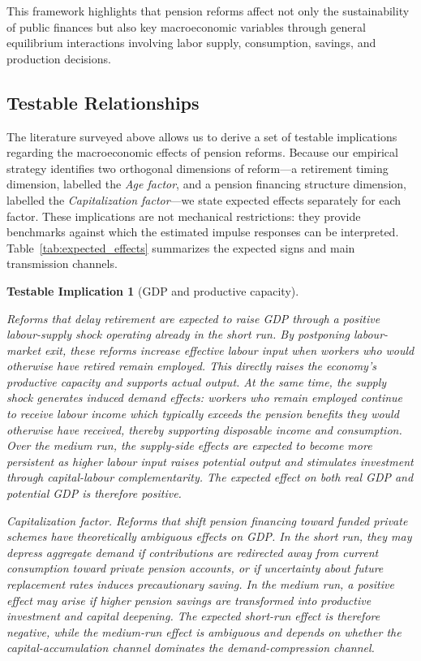\documentclass[11pt,english,a4paper, twoside, authoryear]{article}
\newtheorem{testable}{Testable Implication}}
\begin{document}
This framework highlights that pension reforms affect not only the sustainability of public finances but also key macroeconomic variables through general equilibrium interactions involving labor supply, consumption, savings, and production decisions.

\subsection{Testable Relationships}\label{sec:TR}

The literature surveyed above allows us to derive a set of testable implications regarding the macroeconomic effects of pension reforms. Because our empirical strategy identifies two orthogonal dimensions of reform---a retirement timing dimension, labelled the \emph{Age factor}, and a pension financing structure dimension, labelled the \emph{Capitalization factor}---we state expected effects separately for each factor. These implications are not mechanical restrictions: they provide benchmarks against which the estimated impulse responses can be interpreted. Table~\ref{tab:expected_effects} summarizes the expected signs and main transmission channels. 

\begin{testable}[GDP and productive capacity]\label{test:gdp}

Reforms that delay retirement are expected to raise GDP through a positive labour-supply shock operating already in the short run. By postponing labour-market exit, these reforms increase effective labour input when workers who would otherwise have retired remain employed. This directly raises the economy's productive capacity and supports actual output. At the same time, the supply shock generates induced demand effects: workers who remain employed continue to receive labour income which typically exceeds the pension benefits they would otherwise have received, thereby supporting disposable income and consumption. Over the medium run, the supply-side effects are expected to become more persistent as higher labour input raises potential output and stimulates investment through capital-labour complementarity. The expected effect on both real GDP and potential GDP is therefore positive.

\emph{Capitalization factor.} Reforms that shift pension financing toward funded private schemes have theoretically ambiguous effects on GDP. In the short run, they may depress aggregate demand if contributions are redirected away from current consumption toward private pension accounts, or if uncertainty about future replacement rates induces precautionary saving. In the medium run, a positive effect may arise if higher pension savings are transformed into productive investment and capital deepening. The expected short-run effect is therefore negative, while the medium-run effect is ambiguous and depends on whether the capital-accumulation channel dominates the demand-compression channel.



\end{testable}
\end{document}
